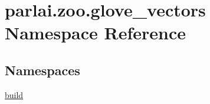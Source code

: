 \hypertarget{namespaceparlai_1_1zoo_1_1glove__vectors}{}\section{parlai.\+zoo.\+glove\+\_\+vectors Namespace Reference}
\label{namespaceparlai_1_1zoo_1_1glove__vectors}
\subsection*{Namespaces}
\begin{DoxyCompactItemize}
\item 
 \hyperlink{namespaceparlai_1_1zoo_1_1glove__vectors_1_1build}{build}
\end{DoxyCompactItemize}
